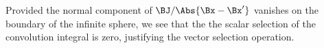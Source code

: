 Provided the normal component of \( \BJ/\Abs{\Bx - \Bx'} \) vanishes on the boundary of the infinite sphere, we see that the 
the scalar selection of the convolution integral is zero, justifying the vector selection operation.
%
%
